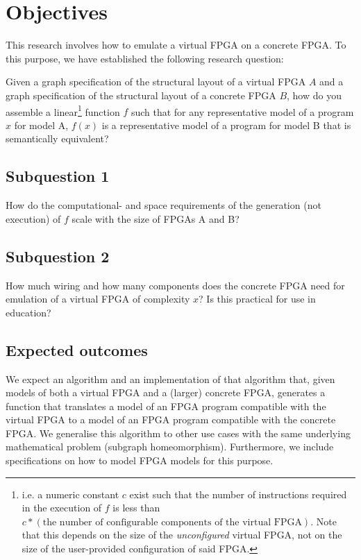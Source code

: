 \chapter{Objectives}
\label{sec:Objectives}
This research involves how to emulate a virtual FPGA on a concrete FPGA. To this purpose, we have established the following research question:

Given a graph specification of the structural layout of a virtual FPGA $A$ and a graph specification of the structural layout of a concrete FPGA $B$, how do you assemble a linear\footnote{i.e. a numeric constant $c$ exist such that the number of instructions required in the execution of $f$ is less than $c * (\text{the number of configurable components of the virtual FPGA})$. Note that this depends on the size of the \textit{unconfigured} virtual FPGA, not on the size of the user-provided configuration of said FPGA.} function $f$ such that for any representative model of a program $x$ for model A, $f(x)$ is a representative model of a program for model B that is semantically equivalent?
\section*{Subquestion 1}
How do the computational- and space requirements of the generation (not execution) of $f$ scale with the size of FPGAs A and B?
\section*{Subquestion 2}
How much wiring and how many components does the concrete FPGA need for emulation of a virtual FPGA of complexity $x$? Is this practical for use in education?
\section*{Expected outcomes}
We expect an algorithm and an implementation of that algorithm that, given models of both a virtual FPGA and a (larger) concrete FPGA, generates a function that translates a model of an FPGA program compatible with the virtual FPGA to a model of an FPGA program compatible with the concrete FPGA. We generalise this algorithm to other use cases with the same underlying mathematical problem (subgraph homeomorphism). Furthermore, we include specifications on how to model FPGA models for this purpose. 